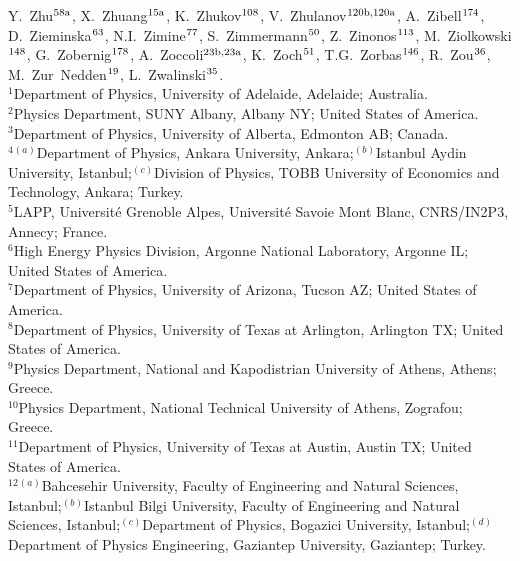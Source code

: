 \begin{flushleft}
Y.~Zhu$^\textrm{\scriptsize 58a}$,    
X.~Zhuang$^\textrm{\scriptsize 15a}$,    
K.~Zhukov$^\textrm{\scriptsize 108}$,    
V.~Zhulanov$^\textrm{\scriptsize 120b,120a}$,    
A.~Zibell$^\textrm{\scriptsize 174}$,    
D.~Zieminska$^\textrm{\scriptsize 63}$,    
N.I.~Zimine$^\textrm{\scriptsize 77}$,    
S.~Zimmermann$^\textrm{\scriptsize 50}$,    
Z.~Zinonos$^\textrm{\scriptsize 113}$,    
M.~Ziolkowski$^\textrm{\scriptsize 148}$,    
G.~Zobernig$^\textrm{\scriptsize 178}$,    
A.~Zoccoli$^\textrm{\scriptsize 23b,23a}$,    
K.~Zoch$^\textrm{\scriptsize 51}$,    
T.G.~Zorbas$^\textrm{\scriptsize 146}$,    
R.~Zou$^\textrm{\scriptsize 36}$,    
M.~Zur~Nedden$^\textrm{\scriptsize 19}$,    
L.~Zwalinski$^\textrm{\scriptsize 35}$.    
\bigskip
\\

$^{1}$Department of Physics, University of Adelaide, Adelaide; Australia.\\
$^{2}$Physics Department, SUNY Albany, Albany NY; United States of America.\\
$^{3}$Department of Physics, University of Alberta, Edmonton AB; Canada.\\
$^{4}$$^{(a)}$Department of Physics, Ankara University, Ankara;$^{(b)}$Istanbul Aydin University, Istanbul;$^{(c)}$Division of Physics, TOBB University of Economics and Technology, Ankara; Turkey.\\
$^{5}$LAPP, Universit\'e Grenoble Alpes, Universit\'e Savoie Mont Blanc, CNRS/IN2P3, Annecy; France.\\
$^{6}$High Energy Physics Division, Argonne National Laboratory, Argonne IL; United States of America.\\
$^{7}$Department of Physics, University of Arizona, Tucson AZ; United States of America.\\
$^{8}$Department of Physics, University of Texas at Arlington, Arlington TX; United States of America.\\
$^{9}$Physics Department, National and Kapodistrian University of Athens, Athens; Greece.\\
$^{10}$Physics Department, National Technical University of Athens, Zografou; Greece.\\
$^{11}$Department of Physics, University of Texas at Austin, Austin TX; United States of America.\\
$^{12}$$^{(a)}$Bahcesehir University, Faculty of Engineering and Natural Sciences, Istanbul;$^{(b)}$Istanbul Bilgi University, Faculty of Engineering and Natural Sciences, Istanbul;$^{(c)}$Department of Physics, Bogazici University, Istanbul;$^{(d)}$Department of Physics Engineering, Gaziantep University, Gaziantep; Turkey.\\

\end{flushleft}
